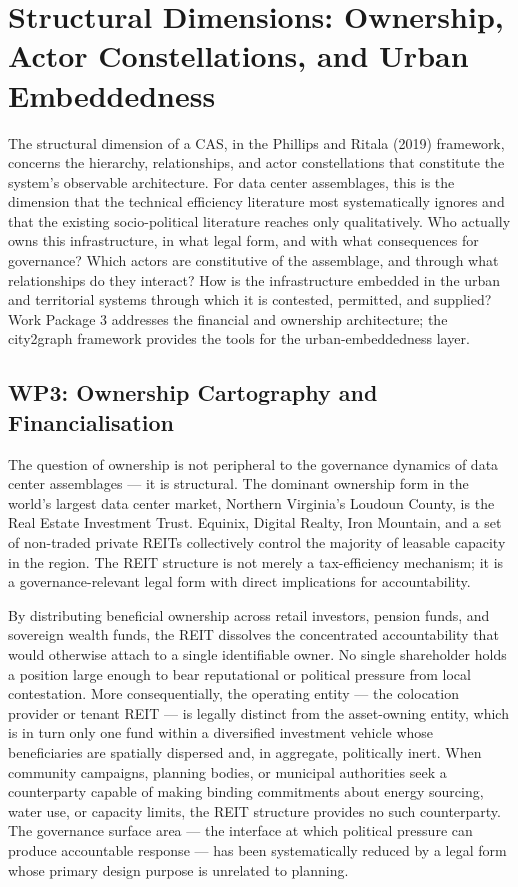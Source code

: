 \section{Structural Dimensions: Ownership, Actor Constellations, and Urban Embeddedness}
\label{sec:structural}

The structural dimension of a CAS, in the Phillips and Ritala (2019) framework, concerns the hierarchy, relationships, and actor constellations that constitute the system's observable architecture. For data center assemblages, this is the dimension that the technical efficiency literature most systematically ignores and that the existing socio-political literature reaches only qualitatively. Who actually owns this infrastructure, in what legal form, and with what consequences for governance? Which actors are constitutive of the assemblage, and through what relationships do they interact? How is the infrastructure embedded in the urban and territorial systems through which it is contested, permitted, and supplied? Work Package 3 addresses the financial and ownership architecture; the city2graph framework \citep{city2graph} provides the tools for the urban-embeddedness layer.

\subsection{WP3: Ownership Cartography and Financialisation}

The question of ownership is not peripheral to the governance dynamics of data center assemblages — it is structural. The dominant ownership form in the world's largest data center market, Northern Virginia's Loudoun County, is the Real Estate Investment Trust. Equinix, Digital Realty, Iron Mountain, and a set of non-traded private REITs collectively control the majority of leasable capacity in the region. The REIT structure is not merely a tax-efficiency mechanism; it is a governance-relevant legal form with direct implications for accountability.

By distributing beneficial ownership across retail investors, pension funds, and sovereign wealth funds, the REIT dissolves the concentrated accountability that would otherwise attach to a single identifiable owner. No single shareholder holds a position large enough to bear reputational or political pressure from local contestation. More consequentially, the operating entity — the colocation provider or tenant REIT — is legally distinct from the asset-owning entity, which is in turn only one fund within a diversified investment vehicle whose beneficiaries are spatially dispersed and, in aggregate, politically inert. When community campaigns, planning bodies, or municipal authorities seek a counterparty capable of making binding commitments about energy sourcing, water use, or capacity limits, the REIT structure provides no such counterparty. The governance surface area — the interface at which political pressure can produce accountable response — has been systematically reduced by a legal form whose primary design purpose is unrelated to planning.

